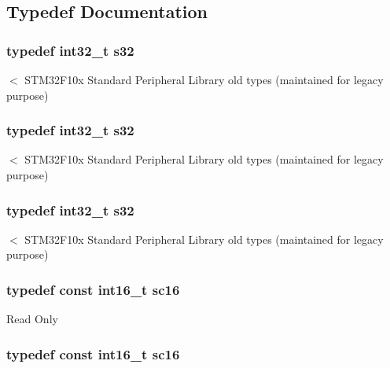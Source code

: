 \subsection{Typedef Documentation}
\hypertarget{group___exported__types_gae9b1af5c037e57a98884758875d3a7c4}{
\subsubsection[{s32}]{\setlength{\rightskip}{0pt plus 5cm}typedef int32\-\_\-t {\bf s32}}}\label{group___exported__types_gae9b1af5c037e57a98884758875d3a7c4}
$<$ S\-T\-M32\-F10x Standard Peripheral Library old types (maintained for legacy purpose) \hypertarget{group___exported__types_gae9b1af5c037e57a98884758875d3a7c4}{
\subsubsection[{s32}]{\setlength{\rightskip}{0pt plus 5cm}typedef int32\-\_\-t {\bf s32}}}\label{group___exported__types_gae9b1af5c037e57a98884758875d3a7c4}
$<$ S\-T\-M32\-F10x Standard Peripheral Library old types (maintained for legacy purpose) \hypertarget{group___exported__types_gae9b1af5c037e57a98884758875d3a7c4}{
\subsubsection[{s32}]{\setlength{\rightskip}{0pt plus 5cm}typedef int32\-\_\-t {\bf s32}}}\label{group___exported__types_gae9b1af5c037e57a98884758875d3a7c4}
$<$ S\-T\-M32\-F10x Standard Peripheral Library old types (maintained for legacy purpose) \hypertarget{group___exported__types_ga66ab742a0751bb4e7661b8e874f2ddda}{
\subsubsection[{sc16}]{\setlength{\rightskip}{0pt plus 5cm}typedef const int16\-\_\-t {\bf sc16}}}\label{group___exported__types_ga66ab742a0751bb4e7661b8e874f2ddda}
Read Only \hypertarget{group___exported__types_ga66ab742a0751bb4e7661b8e874f2ddda}{
\subsubsection[{sc16}]{\setlength{\rightskip}{0pt plus 5cm}typedef const int16\-\_\-t {\bf sc16}}}\label{group___exported__types_ga66ab742a0751bb4e7661b8e874f2ddda}
